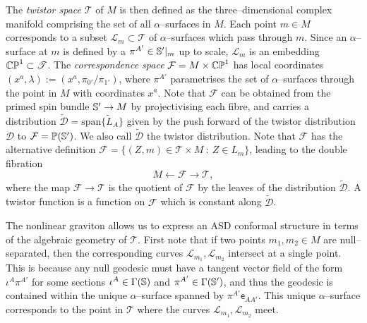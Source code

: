 The \textit{twistor space} $\mathscr{T}$ of $M$ is then defined as the three--dimensional complex manifold comprising the set of all $\alpha$--surfaces in $M$. Each point $m\in M$ corresponds to a subset $\mathscr{L}_m\subset\mathscr{T}$ of $\alpha$--surfaces which pass through $m$. Since an $\alpha$--surface at $m$ is defined by a $\pi^{A'}\in\mathbb{S}'|_m$ up to scale, $\mathscr{L}_m$ is an embedding $\mathbb{CP}^1\subset\mathscr{T}$. The \textit{correspondence space} $\mathcal{F}=M\times\mathbb{CP}^1$ has local coordinates $(x^a,\lambda):=(x^a,\pi_{0'}/\pi_{1'})$, where $\pi^{A'}$ parametrises the set of $\alpha$--surfaces through the point in $M$ with coordinates $x^a$. Note that $\mathcal{F}$ can be obtained from the primed spin bundle $\mathbb{S}'\rightarrow M$ by projectivising each fibre, and carries a distribution $\tilde{\mathcal{D}}=\mathrm{span}\{\tilde{L}_A\}$ given by the push forward of the twistor distribution $\mathcal{D}$ to $\mathcal{F}=\mathbb{P}(\mathbb{S}')$. We also call $\tilde{\mathcal{D}}$ the twistor distribution. Note that $\mathcal{F}$ has the alternative definition $\mathcal{F}=\{(Z,m)\in \mathscr{T}\times M \ :\  Z\in L_m\}$, leading to the double fibration
\[
M\leftarrow\mathcal{F}\rightarrow\mathscr{T},
\]
where the map $\mathcal{F}\rightarrow\mathscr{T}$ is the quotient of $\mathcal{F}$ by the leaves of the distribution $\tilde{\mathcal{D}}$. A twistor function is a function on $\mathcal{F}$ which is constant along $\tilde{\mathcal{D}}$. %

The nonlinear graviton allows us to express an ASD conformal structure in terms of the algebraic geometry of $\mathscr{T}$. First note that if two points $m_1,m_2\in M$ are null--separated, then the corresponding curves $\mathscr{L}_{m_1},\mathscr{L}_{m_2}$ intersect at a single point. This is because any null geodesic must have a tangent vector field of the form $\iota^A\pi^{A'}$ for some sections $\iota^A\in\Gamma(\mathbb{S})$ and $\pi^{A'}\in\Gamma(\mathbb{S}')$, and thus the geodesic is contained within the unique $\alpha$--surface spanned by $\pi^{A'}\mathsf{e}_{AA'}$. This unique $\alpha$--surface corresponds to the point in $\mathscr{T}$ where the curves $\mathscr{L}_{m_1},\mathscr{L}_{m_2}$ meet.

